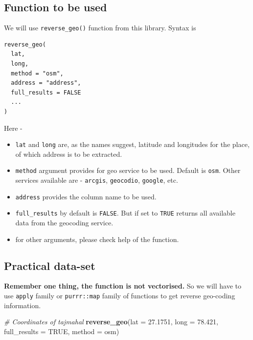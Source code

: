 \documentclass[
]{book}
\newenvironment{Shaded}{\begin{snugshade}}{\end{snugshade}}
\newcommand{\AttributeTok}[1]{\textcolor[rgb]{0.13,0.29,0.53}{#1}}
\newcommand{\CommentTok}[1]{\textcolor[rgb]{0.56,0.35,0.01}{\textit{#1}}}
\newcommand{\ConstantTok}[1]{\textcolor[rgb]{0.56,0.35,0.01}{#1}}
\newcommand{\FloatTok}[1]{\textcolor[rgb]{0.00,0.00,0.81}{#1}}
\newcommand{\FunctionTok}[1]{\textcolor[rgb]{0.13,0.29,0.53}{\textbf{#1}}}
\newcommand{\NormalTok}[1]{#1}
\newcommand{\StringTok}[1]{\textcolor[rgb]{0.31,0.60,0.02}{#1}}
\providecommand{\tightlist}{%
  \setlength{\itemsep}{0pt}\setlength{\parskip}{0pt}}
\begin{document}
\hypertarget{function-to-be-used}{%
\subsection{Function to be used}\label{function-to-be-used}}

We will use \texttt{reverse\_geo()} function from this library. Syntax is

\begin{verbatim}
reverse_geo(
  lat,
  long,
  method = "osm",
  address = "address",
  full_results = FALSE
  ...
)
\end{verbatim}

Here -

\begin{itemize}
\tightlist
\item
  \texttt{lat} and \texttt{long} are, as the names suggest, latitude and longitudes for the place, of which address is to be extracted.
\item
  \texttt{method} argument provides for geo service to be used. Default is \texttt{osm}. Other services available are - \texttt{arcgis}, \texttt{geocodio}, \texttt{google}, etc.
\item
  \texttt{address} provides the column name to be used.
\item
  \texttt{full\_results} by default is \texttt{FALSE}. But if set to \texttt{TRUE} returns all available data from the geocoding service.
\item
  for other arguments, please check help of the function.
\end{itemize}

\hypertarget{practical-data-set}{%
\subsection{Practical data-set}\label{practical-data-set}}

\textbf{Remember one thing, the function is not vectorised.} So we will have to use \texttt{apply} family or \texttt{purrr::map} family of functions to get reverse geo-coding information.

\begin{Shaded}
\begin{Highlighting}[]
\CommentTok{\# Coordinates of tajmahal}
\FunctionTok{reverse\_geo}\NormalTok{(}\AttributeTok{lat =} \FloatTok{27.1751}\NormalTok{, }
            \AttributeTok{long =} \FloatTok{78.421}\NormalTok{, }
            \AttributeTok{full\_results =} \ConstantTok{TRUE}\NormalTok{, }
            \AttributeTok{method =} \StringTok{\textquotesingle{}osm\textquotesingle{}}\NormalTok{)}
\end{Highlighting}
\end{Shaded}
\end{document}
